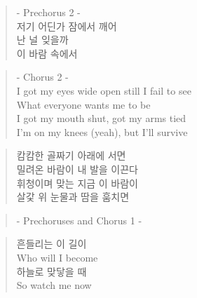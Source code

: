 \begin{verse}
- Prechorus 2 -\\
저기 \ks 어딘가 \ks 잠에서 \ks 깨어\\
난 \ks 널 \ks 잊을까\\
이 \ks 바람 \ks 속에서
\end{verse}

\begin{verse}
- Chorus 2 -\\
I got my eyes wide open still I fail to see\\
What everyone wants me to be\\
I got my mouth shut, got my arms tied\\
I'm on my knees (yeah), but I'll survive
\end{verse}

\begin{verse}
캄캄한 \ks 골짜기 \ks 아래에 \ks 서면\\
밀려온 \ks 바람이 \ks 내 \ks 발을 \ks 이끈다\\
휘청이며 \ks 맞는 \ks 지금 \ks 이 \ks 바람이\\
살갗 \ks 위 \ks 눈물과 \ks 땀을 \ks 훔치면
\end{verse}

\begin{verse}
- Prechoruses and Chorus 1 -
\end{verse}

\begin{verse}
흔들리는 \ks 이 \ks 길이\\
Who will I become\\
하늘로 \ks 맞닿을 \ks 때\\
So watch me now
\end{verse}

\clearpage
